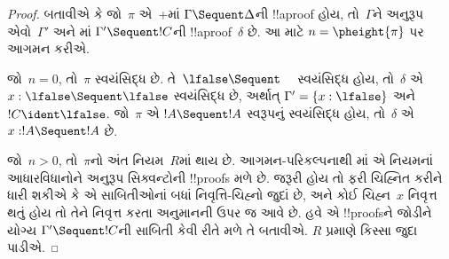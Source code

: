 \documentclass[../../../include/open-logic-section]{subfiles}
\begin{document}
\begin{proof}
  બતાવીએ કે જો~$\pi$
  એ~+\Cut{}માં
  $\Gamma \Sequent \Delta$ની
  !!a{proof} હોય,
  તો~$\Gamma$ને અનુરૂપ
  એવો~$\Gamma'$ અને
  માં
  $\Gamma' \Sequent !C$ની
  !!a{proof}~$\delta$
  છે.
  આ માટે
  $n = \pheight{\pi}$
  પર આગમન કરીએ.

  જો~$n = 0$, તો~$\pi$
  સ્વયંસિદ્ધ છે.
  તે~$\lfalse \Sequent
  \quad$ સ્વયંસિદ્ધ હોય,
  તો~$\delta$ એ
  $x:\lfalse \Sequent \lfalse$
  સ્વયંસિદ્ધ છે,
  અર્થાત્
  $\Gamma' = \{x:\lfalse\}$
  અને~$!C \ident \lfalse$.
  જો~$\pi$ એ
  $!A \Sequent !A$
  સ્વરૂપનું સ્વયંસિદ્ધ
  હોય, તો~$\delta$
  એ~$x: !A \Sequent !A$ છે.
  
  જો~$n>0$, તો~$\pi$નો
  અંત નિયમ~$R$માં થાય છે.
  આગમન-પરિકલ્પનાથી
  માં એ
  નિયમનાં આધારવિધાનોને
  અનુરૂપ સિક્વન્ટોની
  !!{proof}s મળે છે.
  જરૂરી હોય તો ફરી
  ચિહ્નિત કરીને ધારી
  શકીએ કે એ સાબિતીઓનાં
  બધાં નિવૃત્તિ-ચિહ્નો
  જુદાં છે, અને
  કોઈ ચિહ્ન~$x$
  નિવૃત્ત થતું હોય
  તો તેને નિવૃત્ત કરતા
  અનુમાનની ઉપર જ
  આવે છે.
  હવે એ !!{proof}sને
  જોડીને યોગ્ય
  $\Gamma' \Sequent !C$ની
  સાબિતી કેવી રીતે
  મળે તે બતાવીએ.
  $R$ પ્રમાણે કિસ્સા
  જુદા પાડીએ.


\end{proof}
\end{document}
